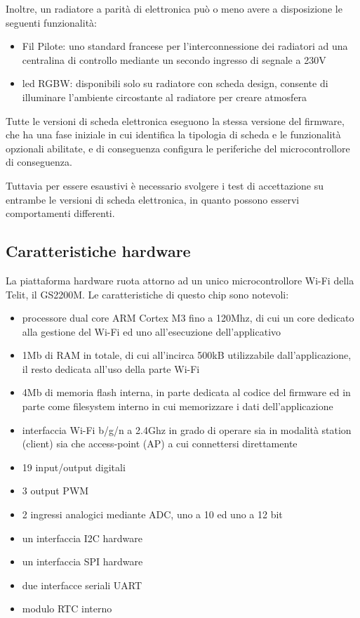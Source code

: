 \documentclass{article}
\begin{document}
Inoltre, un radiatore a parità di elettronica può o meno avere a disposizione le
seguenti funzionalità:
\begin{itemize}
    \item Fil Pilote: uno standard francese per l'interconnessione dei radiatori ad una
        centralina di controllo mediante un secondo ingresso di segnale a 230V
    \item led RGBW: disponibili solo su radiatore con scheda design, consente di
        illuminare l'ambiente circostante al radiatore per creare atmosfera
\end{itemize}

Tutte le versioni di scheda elettronica eseguono la stessa versione del firmware,
che ha una fase iniziale in cui identifica la tipologia di scheda e le funzionalità
opzionali abilitate, e di conseguenza configura le periferiche del microcontrollore di conseguenza.

Tuttavia per essere esaustivi è necessario svolgere i test di accettazione su entrambe
le versioni di scheda elettronica, in quanto possono esservi comportamenti differenti.

\subsection{Caratteristiche hardware}

La piattaforma hardware ruota attorno ad un unico microcontrollore Wi-Fi della Telit, il GS2200M.
Le caratteristiche di questo chip sono notevoli:

\begin{itemize}
    \item processore dual core ARM Cortex M3 fino a 120Mhz, di cui un core dedicato
        alla gestione del Wi-Fi ed uno all'esecuzione dell'applicativo
    \item 1Mb di RAM in totale, di cui all'incirca 500kB utilizzabile dall’applicazione,
        il resto dedicata all'uso della parte Wi-Fi
    \item 4Mb di memoria flash interna, in parte dedicata al codice del firmware ed
        in parte come filesystem interno in cui memorizzare i dati dell'applicazione
    \item interfaccia Wi-Fi b/g/n a 2.4Ghz in grado di operare sia in modalità station
        (client) sia che access-point (AP) a cui connettersi direttamente
    \item 19 input/output digitali
    \item 3 output PWM
    \item 2 ingressi analogici mediante ADC, uno a 10 ed uno a 12 bit
    \item un interfaccia I2C hardware
    \item un interfaccia SPI hardware
    \item due interfacce seriali UART
    \item modulo RTC interno
\end{itemize}
\end{document}
